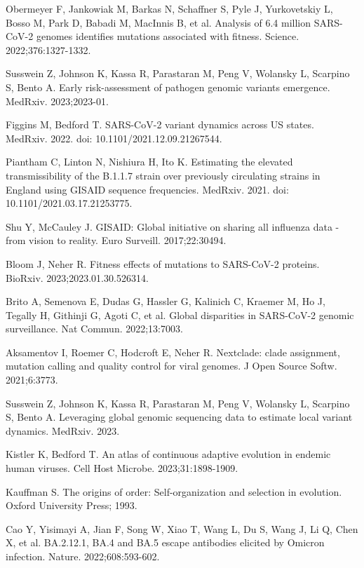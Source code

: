 \documentclass[10pt,letterpaper]{article}
\begin{document}
\begin{thebibliography}{10}
 Obermeyer F, Jankowiak M, Barkas N, Schaffner S, Pyle J, Yurkovetskiy L, Bosso M, Park D, Babadi M, MacInnis B, et al. Analysis of 6.4 million SARS-CoV-2 genomes identifies mutations associated with fitness. Science. 2022;376:1327-1332.

 Susswein Z, Johnson K, Kassa R, Parastaran M, Peng V, Wolansky L, Scarpino S, Bento A. Early risk-assessment of pathogen genomic variants emergence. MedRxiv. 2023;2023-01.

 Figgins M, Bedford T. SARS-CoV-2 variant dynamics across US states. MedRxiv. 2022. doi: 10.1101/2021.12.09.21267544.

 Piantham C, Linton N, Nishiura H, Ito K. Estimating the elevated transmissibility of the B.1.1.7 strain over previously circulating strains in England using GISAID sequence frequencies. MedRxiv. 2021. doi: 10.1101/2021.03.17.21253775.

 Shu Y, McCauley J. GISAID: Global initiative on sharing all influenza data - from vision to reality. Euro Surveill. 2017;22:30494.

 Bloom J, Neher R. Fitness effects of mutations to SARS-CoV-2 proteins. BioRxiv. 2023;2023.01.30.526314.

 Brito A, Semenova E, Dudas G, Hassler G, Kalinich C, Kraemer M, Ho J, Tegally H, Githinji G, Agoti C, et al. Global disparities in SARS-CoV-2 genomic surveillance. Nat Commun. 2022;13:7003.

 Aksamentov I, Roemer C, Hodcroft E, Neher R. Nextclade: clade assignment, mutation calling and quality control for viral genomes. J Open Source Softw. 2021;6:3773.

 Susswein Z, Johnson K, Kassa R, Parastaran M, Peng V, Wolansky L, Scarpino S, Bento A. Leveraging global genomic sequencing data to estimate local variant dynamics. MedRxiv. 2023.

 Kistler K, Bedford T. An atlas of continuous adaptive evolution in endemic human viruses. Cell Host Microbe. 2023;31:1898-1909.

 Kauffman S. The origins of order: Self-organization and selection in evolution. Oxford University Press; 1993.

 Cao Y, Yisimayi A, Jian F, Song W, Xiao T, Wang L, Du S, Wang J, Li Q, Chen X, et al. BA.2.12.1, BA.4 and BA.5 escape antibodies elicited by Omicron infection. Nature. 2022;608:593-602.


\end{thebibliography}
\end{document}
